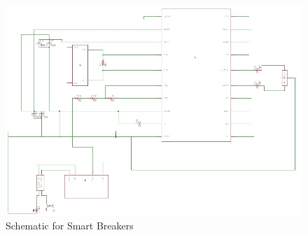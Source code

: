 









\begin{figure}[htbp]
\begin{center}
\includegraphics[width=\textwidth]{includes/NJADESchematic} 
\caption{Schematic for Smart Breakers}
\label{fig:ade_schematic}   
\end{center}
\end{figure}

